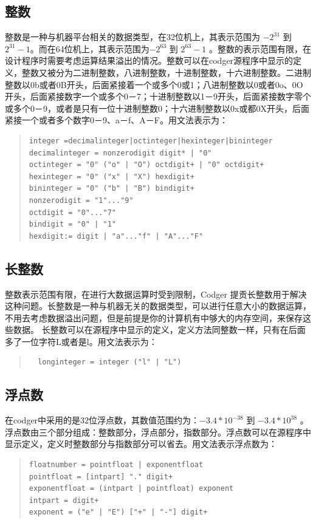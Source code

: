 \subsection{整数}
整数是一种与机器平台相关的数据类型，在32位机上，其表示范围为 $-2^{31}$ 到 $2^{31}-1$。而在64位机上，其表示范围为$-2^{63}$ 到 $2^{63}-1$ 。整数的表示范围有限，在设计程序时需要考虑运算结果溢出的情况。整数可以在codger源程序中显示的定义，整数又被分为二进制整数，八进制整数，十进制整数，十六进制整数。二进制整数以0b或者0B开头，后面紧接着一个或多个0或1；八进制整数以0或者0o、0O开头，后面紧接数字一个或多个0－7；十进制整数以1－9开头，后面紧接数字零个或多个0－9，或者是只有一位十进制整数0；十六进制整数以0x或都0X开头，后面紧接一个或者多个数字0－9、a－f、A－F。用文法表示为：
\begin{quote}
\begin{verbatim}
integer =decimalinteger|octinteger|hexinteger|bininteger
decimalinteger = nonzerodigit digit* | "0"
octinteger = "0" ("o" | "O") octdigit+ | "0" octdigit+
hexinteger = "0" ("x" | "X") hexdigit+
bininteger = "0" ("b" | "B") bindigit+
nonzerodigit = "1"..."9"
octdigit = "0"..."7"
bindigit = "0" | "1"
hexdigit:= digit | "a"..."f" | "A"..."F"
\end{verbatim}
\end{quote}

\subsection{长整数}
整数表示范围有限，在进行大数据运算时受到限制，Codger 提贡长整数用于解决这种问题。长整数是一种与机器无关的数据类型，可以进行任意大小的数据运算，不用去考虑数据溢出问题，但是前提是你的计算机有中够大的内存空间，来保存这些数据。 长整数可以在源程序中显示的定义，定义方法同整数一样，只有在后面多了一位字符L或者是l。用文法表示为：
\begin{quote}
 \begin{verbatim}
  longinteger = integer ("l" | "L")
 \end{verbatim}
\end{quote}

\subsection{浮点数}
在codger中采用的是32位浮点数，其数值范围约为：$-3.4*10^{-38}$ 到 $-3.4*10^{38}$ 。浮点数由三个部分组成：整数部分，浮点部分，指数部分。浮点数可以在源程序中显示定义，定义时整数部分与指数部分可以省去。用文法表示浮点数为：
\begin{quote}
 \begin{verbatim}
floatnumber = pointfloat | exponentfloat
pointfloat = [intpart] "." digit+
exponentfloat = (intpart | pointfloat) exponent
intpart = digit+
exponent = ("e" | "E") ["+" | "-"] digit+
 \end{verbatim}
\end{quote}
